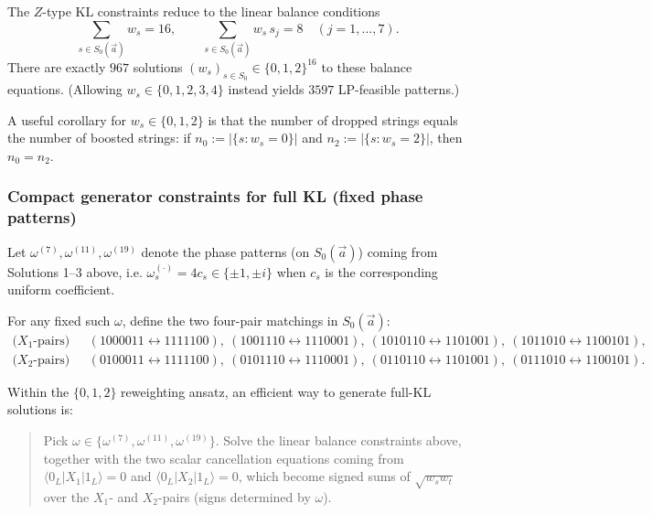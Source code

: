 \documentclass[11pt]{article}
\begin{document}
The \(Z\)-type KL constraints reduce to the linear balance conditions
\[
\boxed{
\sum_{s\in S_0(\vec a)} w_s = 16,
\qquad
\sum_{s\in S_0(\vec a)} w_s\, s_j = 8 \quad (j=1,\dots,7).
}
\]
There are exactly \(967\) solutions \((w_s)_{s\in S_0}\in\{0,1,2\}^{16}\) to these balance equations.
(Allowing \(w_s\in\{0,1,2,3,4\}\) instead yields \(3597\) LP-feasible patterns.)

A useful corollary for \(w_s\in\{0,1,2\}\) is that the number of dropped strings equals the number of boosted strings:
if \(n_0:=|\{s:w_s=0\}|\) and \(n_2:=|\{s:w_s=2\}|\), then \(n_0=n_2\).

\subsubsection{Compact generator constraints for full KL (fixed phase patterns)}

Let \(\omega^{(7)},\omega^{(11)},\omega^{(19)}\) denote the phase patterns (on \(S_0(\vec a)\)) coming from Solutions 1--3 above, i.e. \(\omega_s^{(\cdot)}=4c_s\in\{\pm1,\pm i\}\) when \(c_s\) is the corresponding uniform coefficient.

For any fixed such \(\omega\), define the two four-pair matchings in \(S_0(\vec a)\):
\[
\begin{aligned}
\text{(\(X_1\)-pairs)}\quad
&(1000011 \leftrightarrow 1111100),\ (1001110 \leftrightarrow 1110001),\ (1010110 \leftrightarrow 1101001),\ (1011010 \leftrightarrow 1100101),\\
\text{(\(X_2\)-pairs)}\quad
&(0100011 \leftrightarrow 1111100),\ (0101110 \leftrightarrow 1110001),\ (0110110 \leftrightarrow 1101001),\ (0111010 \leftrightarrow 1100101).
\end{aligned}
\]

Within the \(\{0,1,2\}\) reweighting ansatz, an efficient way to generate full-KL solutions is:
\begin{quote}
Pick \(\omega\in\{\omega^{(7)},\omega^{(11)},\omega^{(19)}\}\). Solve the linear balance constraints above, together with the two scalar cancellation equations coming from \(\langle 0_L|X_1|1_L\rangle=0\) and \(\langle 0_L|X_2|1_L\rangle=0\), which become signed sums of \(\sqrt{w_s w_t}\) over the \(X_1\)- and \(X_2\)-pairs (signs determined by \(\omega\)).
\end{quote}
\end{document}
